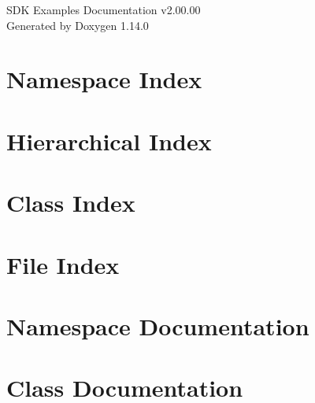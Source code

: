 \documentclass[twoside]{book}
\newcommand{\+}{\discretionary{\mbox{\scriptsize$\hookleftarrow$}}{}{}}
\newcommand{\clearemptydoublepage}{%
    \newpage{\pagestyle{empty}\cleardoublepage}%
  }
\begin{document}
  \raggedbottom
    \hypersetup{pageanchor=false,
                bookmarksnumbered=true,
                pdfencoding=unicode
               }
  \begin{titlepage}
  \vspace*{7cm}
  \begin{center}%
  {\Large SDK Examples Documentation v2.\+00.\+00}\\
  \vspace*{1cm}
  {\large Generated by Doxygen 1.14.0}\\
  \end{center}
  \end{titlepage}
  \clearemptydoublepage
  \tableofcontents
  \clearemptydoublepage
  \hypersetup{pageanchor=true}
\chapter{Namespace Index}

\chapter{Hierarchical Index}

\chapter{Class Index}

\chapter{File Index}

\chapter{Namespace Documentation}


\chapter{Class Documentation}




\end{document}
